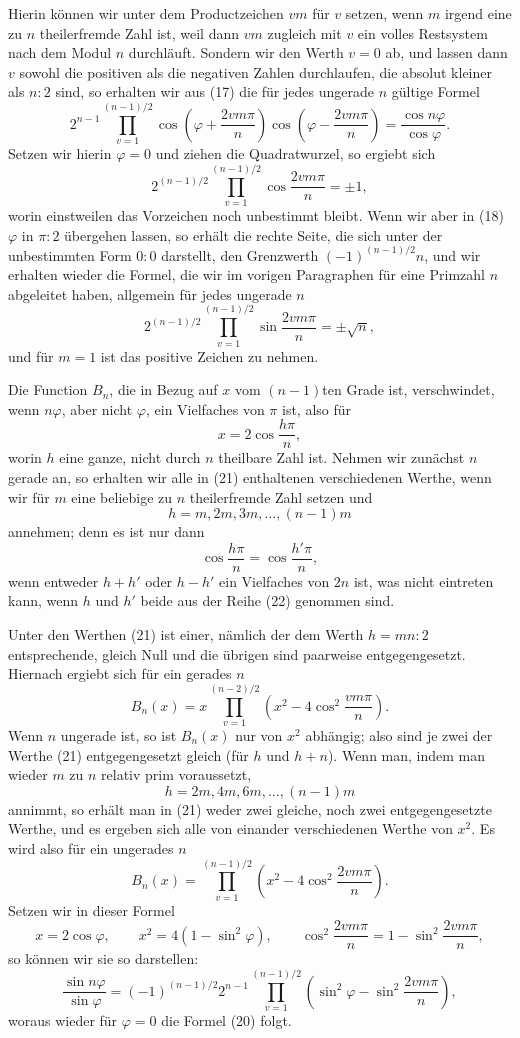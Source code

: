 \documentclass[11pt]{article}
\begin{document}
Hierin können wir unter dem Productzeichen $vm$ für $v$ setzen, wenn $m$ irgend eine zu $n$ theilerfremde Zahl ist, weil dann $vm$ zugleich mit $v$ ein volles Restsystem nach dem Modul $n$ durchläuft. Sondern wir den Werth $v=0$ ab, und lassen dann $v$ sowohl die positiven als die negativen Zahlen durchlaufen, die absolut kleiner als $n:2$ sind, so erhalten wir aus (17) die für jedes ungerade $n$ gültige Formel
\[
\tag{18}       2^{n-1}\prod_{v=1}^{(n-1)/2}
\cos\left(\varphi+\frac{2vm\pi}{n}\right)
\cos\left(\varphi-\frac{2vm\pi}{n}\right)
=\frac{\cos n\varphi}{\cos\varphi}.
\]
Setzen wir hierin $\varphi=0$ und ziehen die Quadratwurzel, so ergiebt sich
\[
\tag{19}       2^{(n-1)/2}\prod_{v=1}^{(n-1)/2}\cos\frac{2vm\pi}{n}=\pm1,
\]
worin einstweilen das Vorzeichen noch unbestimmt bleibt. Wenn wir aber in (18) $\varphi$ in $\pi:2$ übergehen lassen, so erhält die rechte Seite, die sich unter der unbestimmten Form $0:0$ darstellt, den Grenzwerth $(-1)^{(n-1)/2}n$, und wir erhalten wieder die Formel, die wir im vorigen Paragraphen für eine Primzahl $n$ abgeleitet haben, allgemein für jedes ungerade $n$
\[
\tag{20}       2^{(n-1)/2}\prod_{v=1}^{(n-1)/2}\sin\frac{2vm\pi}{n}=\pm\sqrt n,
\]
und für $m=1$ ist das positive Zeichen zu nehmen.

Die Function $B_n$, die in Bezug auf $x$ vom $(n-1)$ten Grade ist, verschwindet, wenn $n\varphi$, aber nicht $\varphi$, ein Vielfaches von $\pi$ ist, also für
\[
\tag{21}       x=2\cos\frac{h\pi}{n},
\]
worin $h$ eine ganze, nicht durch $n$ theilbare Zahl ist. Nehmen wir zunächst $n$ gerade an, so erhalten wir alle in (21) enthaltenen verschiedenen Werthe, wenn wir für $m$ eine beliebige zu $n$ theilerfremde Zahl setzen und
\[
\tag{22}       h=m,2m,3m,\ldots,(n-1)m
\]
annehmen; denn es ist nur dann
\[
        \cos\frac{h\pi}{n}=\cos\frac{h'\pi}{n},
\]
wenn entweder $h+h'$ oder $h-h'$ ein Vielfaches von $2n$ ist, was nicht eintreten kann, wenn $h$ und $h'$ beide aus der Reihe (22) genommen sind.

Unter den Werthen (21) ist einer, nämlich der dem Werth $h=mn:2$ entsprechende, gleich Null und die übrigen sind paarweise entgegengesetzt. Hiernach ergiebt sich für ein gerades $n$
\[
\tag{23}       B_n(x)=x\prod_{v=1}^{(n-2)/2}\left(x^2-4\cos^2\frac{v m\pi}{n}\right).
\]
Wenn $n$ ungerade ist, so ist $B_n(x)$ nur von $x^2$ abhängig; also sind je zwei der Werthe (21) entgegengesetzt gleich (für $h$ und $h+n$). Wenn man, indem man wieder $m$ zu $n$ relativ prim voraussetzt,
\[
        h=2m,4m,6m,\ldots,(n-1)m
\]
annimmt, so erhält man in (21) weder zwei gleiche, noch zwei entgegengesetzte Werthe, und es ergeben sich alle von einander verschiedenen Werthe von $x^2$. Es wird also für ein ungerades $n$
\[
\tag{24}       B_n(x)=\prod_{v=1}^{(n-1)/2}
\left(x^2-4\cos^2\frac{2vm\pi}{n}\right).
\]
Setzen wir in dieser Formel
\[
        x=2\cos\varphi,
        \qquad x^2=4(1-\sin^2\varphi),
        \qquad \cos^2\frac{2vm\pi}{n}=1-\sin^2\frac{2vm\pi}{n},
\]
so können wir sie so darstellen:
\[
\tag{25}       \frac{\sin n\varphi}{\sin\varphi}
=(-1)^{(n-1)/2}2^{n-1}\prod_{v=1}^{(n-1)/2}
\left(\sin^2\varphi-\sin^2\frac{2vm\pi}{n}\right),
\]
woraus wieder für $\varphi=0$ die Formel (20) folgt.
\end{document}
